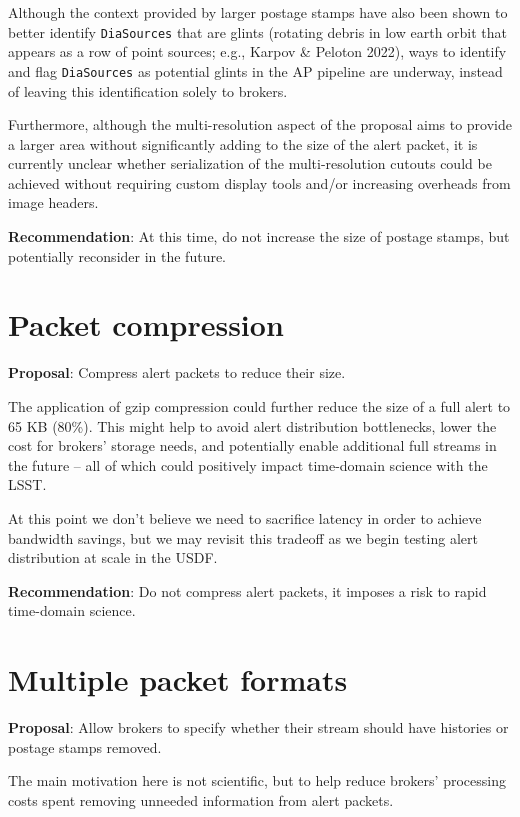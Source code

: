 \documentclass[DM,authoryear,toc]{lsstdoc}
\begin{document}
Although the context provided by larger postage stamps have also been shown to better identify \texttt{DiaSources} that are glints
(rotating debris in low earth orbit that appears as a row of point sources; e.g., Karpov \& Peloton 2022), ways to identify and flag \texttt{DiaSources}
as potential glints in the AP pipeline are underway, instead of leaving this identification solely to brokers.

Furthermore, although the multi-resolution aspect of the proposal aims to provide a larger area without significantly
adding to the size of the alert packet, it is currently unclear whether serialization of the multi-resolution cutouts could be achieved without requiring custom display tools and/or increasing overheads from image headers.

\textbf{Recommendation}: At this time, do not increase the size of postage stamps, but potentially reconsider in the future.


\section{Packet compression}\label{sec:compression}

\textbf{Proposal}: Compress alert packets to reduce their size.

The application of gzip compression could further reduce the size of a full alert to 65 KB (80\%).
This might help to avoid alert distribution bottlenecks, lower the cost for brokers' storage needs, and potentially enable 
additional full streams in the future -- all of which could positively impact time-domain science with the LSST.

At this point we don't believe we need to sacrifice latency in order to achieve bandwidth savings, but 
we may revisit this tradeoff as we begin testing alert distribution at scale in the USDF.

\textbf{Recommendation}: Do not compress alert packets, it imposes a risk to rapid time-domain science.


\section{Multiple packet formats}\label{sec:multiformats}

\textbf{Proposal}: Allow brokers to specify whether their stream should have histories or postage stamps removed.

The main motivation here is not scientific, but to help reduce brokers' processing costs spent removing unneeded information 
from alert packets. 
\end{document}
